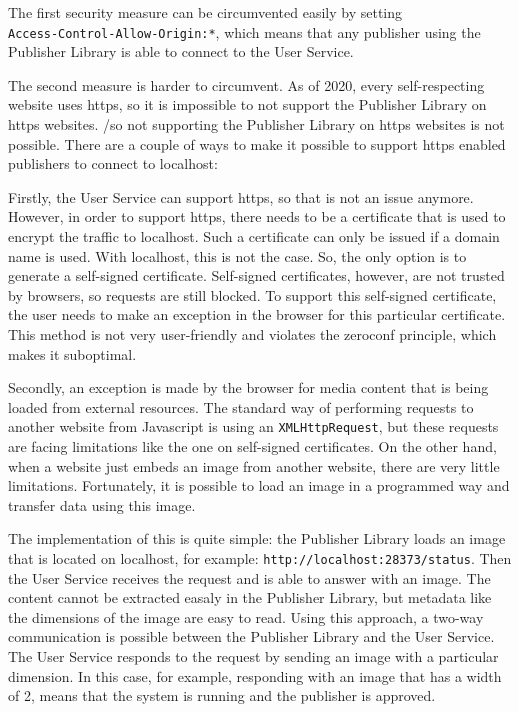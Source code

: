 The first security measure can be circumvented easily by setting \\\texttt{Access-Control-Allow-Origin:*}, which means that any publisher using the Publisher Library is able to connect to the User Service. 

The second measure is harder to circumvent. As of 2020, every self-respecting website uses https, so it is impossible to not support the Publisher Library on https websites. /so not supporting the Publisher Library on https websites is not possible. There are a couple of ways to make it possible to support https enabled publishers to connect to localhost:

 
Firstly, the User Service can support https, so that is not an issue anymore. However, in order to support https, there needs to be a certificate that is used to encrypt the traffic to localhost. Such a certificate can only be issued if a domain name is used. With localhost, this is not the case. So, the only option is to generate a self-signed certificate. Self-signed certificates, however, are not trusted by browsers, so requests are still blocked. To support this self-signed certificate, the user needs to make an exception in the browser for this particular certificate. This method is not very user-friendly and violates the zeroconf principle, which makes it suboptimal.

Secondly, an exception is made by the browser for media content that is being loaded from external resources. The standard way of performing requests to another website from Javascript is using an \texttt{XMLHttpRequest}, but these requests are facing limitations like the one on self-signed certificates. On the other hand, when a website just embeds an image from another website, there are very little limitations. Fortunately, it is possible to load an image in a programmed way and transfer data using this image.

The implementation of this is quite simple: the Publisher Library loads an image that is located on localhost, for example: \texttt{http://localhost:28373/status}. Then the User Service receives the request and is able to answer with an image. The content cannot be extracted easaly in the Publisher Library, but metadata like the dimensions of the image are easy to read. Using this approach, a two-way communication is possible between the Publisher Library and the User Service. The User Service responds to the request by sending an image with a particular dimension. In this case, for example, responding with an image that has a width of 2, means that the system is running and the publisher is approved.

